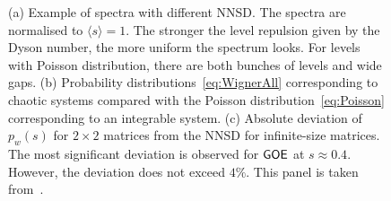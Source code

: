 \documentclass[a4paper,11pt,twoside]{article}
\begin{document}
            \begin{figure}[!htbp]
                \begin{subfigure}{0.55\linewidth}
                    \centering{}
                \end{subfigure}
                \hfill
                \begin{subfigure}{0.44\linewidth}
                    \centering{}
                    \centering{}
                \end{subfigure}
                \caption{
                    \protect\small
                    (a) Example of spectra with different NNSD.
                    The spectra are normalised to $\langle s\rangle=1$.
                    The stronger the level repulsion given by the Dyson number,
                    the more uniform the spectrum looks.
                    For levels with Poisson distribution, there are both bunches of levels and wide gaps.
                    (b) Probability distributions~\eqref{eq:WignerAll} corresponding to chaotic systems compared with the Poisson distribution~\eqref{eq:Poisson} corresponding to an integrable system.
                    (c) Absolute deviation of $p_{w}(s)$ for $2\times2$ matrices from the NNSD for infinite-size matrices.
                    The most significant deviation is observed for $\mathsf{GOE}$ at $s\approx0.4$.
                    However, the deviation does not exceed $4\%$.
                    This panel is taken from~\cite{Haa10}.
                }	
                \label{fig:Ensembles}
            \end{figure}
\end{document}
